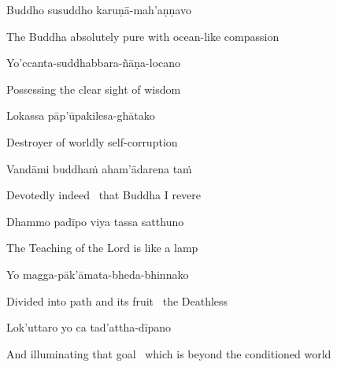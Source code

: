 Buddho susuddho karuṇā-mah'aṇṇavo

\begin{english}
  The Buddha absolutely pure with ocean-like compassion
\end{english}

Yo'ccanta-suddhabbara-ñāṇa-locano

\begin{english}
  Possessing the clear sight of wisdom
\end{english}

Lokassa pāp'ūpakilesa-ghātako

\begin{english}
  Destroyer of worldly self-corruption
\end{english}

Vandāmi buddhaṁ aham'ādarena taṁ

\begin{english}
  Devotedly indeed \breathmark\ that Buddha I revere
\end{english}

Dhammo padīpo viya tassa satthuno

\begin{english}
  The Teaching of the Lord is like a lamp\ifdigital\makeatletter\hyperlink{endnote8-appendix}\makeatother\fi
\end{english}

Yo magga-pāk'āmata-bheda-bhinnako

\begin{english}
  Divided into path and its fruit \breathmark\ the Deathless\ifdigital\makeatletter\hyperlink{endnote9-appendix}\makeatother\fi
\end{english}

\ifninebythirteen\clearpage\fi

Lok'uttaro yo ca tad'attha-dīpano

\begin{english-hang}
  And illuminating that goal \breathmark\ which is beyond the conditioned world\ifdigital\makeatletter\hyperlink{endnote10-appendix}\makeatother\fi
\end{english-hang}

